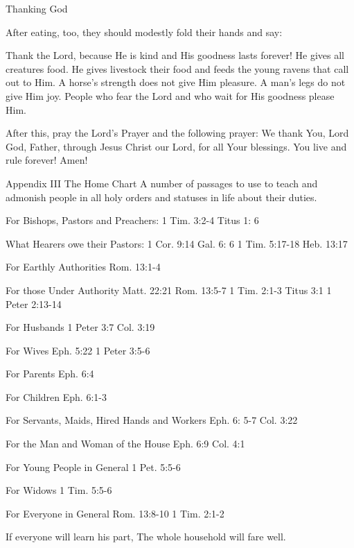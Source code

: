 Thanking God

After eating, too, they should modestly fold their hands and say:

Thank the Lord, because He is kind and His goodness lasts forever! He
gives all creatures food. He gives livestock their food and feeds the
young ravens that call out to Him. A horse's strength does not give Him
pleasure. A man's legs do not give Him joy. People who fear the Lord
and who wait for His goodness please Him.

After this, pray the Lord's Prayer and the following prayer:
We thank You, Lord God, Father, through Jesus Christ our Lord, for all
Your blessings. You live and rule forever! Amen!

Appendix III
The Home Chart
A number of passages to use to teach and admonish people in all holy
orders and statuses in life about their
duties.

For Bishops, Pastors and Preachers:
1 Tim. 3:2-4
Titus 1: 6

What Hearers owe their Pastors:
1 Cor. 9:14
Gal. 6: 6
1 Tim. 5:17-18
Heb. 13:17

For Earthly Authorities
Rom. 13:1-4

For those Under Authority
Matt. 22:21
Rom. 13:5-7
1 Tim. 2:1-3
Titus 3:1
1 Peter 2:13-14

For Husbands
1 Peter 3:7
Col. 3:19

For Wives
Eph. 5:22
1 Peter 3:5-6

For Parents
Eph. 6:4

For Children
Eph. 6:1-3

For Servants, Maids, Hired Hands and Workers
Eph. 6: 5-7
Col. 3:22

For the Man and Woman of the House
Eph. 6:9
Col. 4:1

For Young People in General
1 Pet. 5:5-6

For Widows
1 Tim. 5:5-6

For Everyone in General
Rom. 13:8-10
1 Tim. 2:1-2

If everyone will learn his part,
The whole household will fare well.
